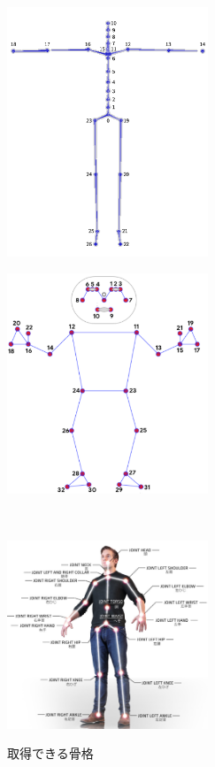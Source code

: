 \documentclass[a4j, fleqn, 12pt]{jsreport}
\begin{document}
\begin{figure}[t]
    \centering
    \begin{minipage}[]{0.45\hsize}
        \centering
        \includegraphics[width=6cm]{img/TechSpec_02.png}
        \label{mocopi}
    \end{minipage}
    \begin{minipage}[]{0.45\hsize}
        \centering
        \includegraphics[width=6cm]{img/media.png}
        \label{RGB}
    \end{minipage}\\
    \begin{minipage}[]{0.45\hsize}
        \centering
        \includegraphics[width=6cm]{img/nuitrack.png}
        \label{RGBD}
    \end{minipage}
    \caption{取得できる骨格}
    \label{sokutei}
\end{figure}
\end{document}
